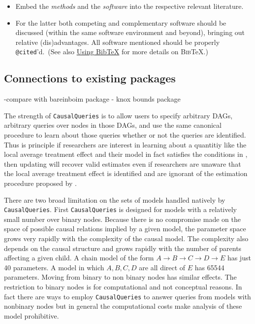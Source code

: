 \documentclass[
  article]{jss}
\providecommand{\tightlist}{%
  \setlength{\itemsep}{0pt}\setlength{\parskip}{0pt}}\usepackage{longtable,booktabs,array}
\begin{document}
\begin{itemize}
\tightlist
\item
  Embed the \emph{methods} and the \emph{software} into the respective
  relevant literature.
\item
  For the latter both competing and complementary software should be
  discussed (within the same software environment and beyond), bringing
  out relative (dis)advantages. All software mentioned should be
  properly \texttt{@cited}'d.~(See also
  \protect\hyperlink{sec-bibtex}{Using BibTeX} for more details on
  \textsc{Bib}{\TeX}.)
\end{itemize}

\hypertarget{connections-to-existing-packages}{%
\subsection{Connections to existing
packages}\label{connections-to-existing-packages}}

-compare with bareinboim package - knox bounds package

The strength of \texttt{CausalQueries} is to allow users to specify
arbitrary DAGs, arbitrary queries over nodes in those DAGs, and use the
same canonical procedure to learn about those queries whether or not the
queries are identified. Thus is principle if researchers are interest in
learning about a quantitiy like the local average treatment effect and
their model in fact satisfies the conditions in
\citet{angrist1996identification}, then updating will recover valid
estimates even if researchers are unaware that the local average
treatment effect is identified and are ignorant of the estimation
procedure proposed by \citet{angrist1996identification}.

There are two broad limitation on the sets of models handled natively by
\texttt{CausalQueries}. First \texttt{CausalQueries} is designed for
models with a relatively small number over binary nodes. Because there
is no compromise made on the space of possible causal relations implied
by a given model, the parameter space grows very rapidly with the
complexity of the causal model. The complexity also depends on the
causal structure and grows rapidly with the number of parents affecting
a given child. A chain model of the form
\(A \rightarrow B \rightarrow C \rightarrow D \rightarrow E\) has just
40 parameters. A model in which \(A, B, C, D\) are all direct of \(E\)
has 65544 parameters. Moving from binary to non binary nodes has similar
effects. The restriction to binary nodes is for computational and not
conceptual reasons. In fact there are ways to employ
\texttt{CausalQueries} to answer queries from models with nonbinary
nodes but in general the computational costs make analysis of these
model prohibitive.
\end{document}
